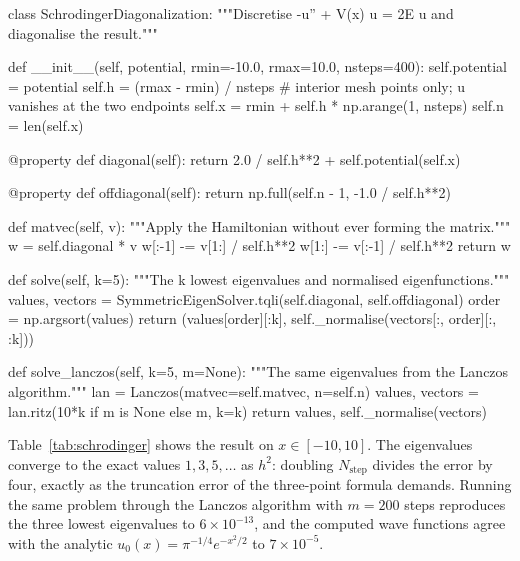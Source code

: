 \begin{Python}{}
class SchrodingerDiagonalization:
    """Discretise -u'' + V(x) u = 2E u and diagonalise the result."""

    def __init__(self, potential, rmin=-10.0, rmax=10.0, nsteps=400):
        self.potential = potential
        self.h = (rmax - rmin) / nsteps
        # interior mesh points only; u vanishes at the two endpoints
        self.x = rmin + self.h * np.arange(1, nsteps)
        self.n = len(self.x)

    @property
    def diagonal(self):
        return 2.0 / self.h**2 + self.potential(self.x)

    @property
    def offdiagonal(self):
        return np.full(self.n - 1, -1.0 / self.h**2)

    def matvec(self, v):
        """Apply the Hamiltonian without ever forming the matrix."""
        w = self.diagonal * v
        w[:-1] -= v[1:] / self.h**2
        w[1:] -= v[:-1] / self.h**2
        return w

    def solve(self, k=5):
        """The k lowest eigenvalues and normalised eigenfunctions."""
        values, vectors = SymmetricEigenSolver.tqli(self.diagonal,
                                                    self.offdiagonal)
        order = np.argsort(values)
        return (values[order][:k],
                self._normalise(vectors[:, order][:, :k]))

    def solve_lanczos(self, k=5, m=None):
        """The same eigenvalues from the Lanczos algorithm."""
        lan = Lanczos(matvec=self.matvec, n=self.n)
        values, vectors = lan.ritz(10*k if m is None else m, k=k)
        return values, self._normalise(vectors)
\end{Python}

Table~\ref{tab:schrodinger} shows the result on $x\in[-10,10]$.  The
eigenvalues converge to the exact values $1,3,5,\dots$ as $h^2$: doubling
$N_{\mathrm{step}}$ divides the error by four, exactly as the truncation error
of the three-point formula demands.  Running the same problem through the
Lanczos algorithm with $m=200$ steps reproduces the three lowest eigenvalues
to $6\times10^{-13}$, and the computed wave functions agree with the analytic
$u_0(x)=\pi^{-1/4}e^{-x^2/2}$ to $7\times10^{-5}$.


